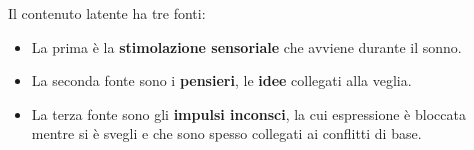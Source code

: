 \documentclass{subfiles}
\begin{document}
Il contenuto latente ha tre fonti:
\begin{itemize}
    \item La prima è la \textbf{stimolazione sensoriale} che avviene durante il sonno.
    \item La seconda fonte sono i \textbf{pensieri}, le \textbf{idee} collegati alla veglia.
    \item La terza fonte sono gli \textbf{impulsi inconsci}, la cui espressione è bloccata mentre 
    si è svegli e che sono spesso collegati ai conflitti di base.
\end{itemize}

\clearpage
\end{document}
